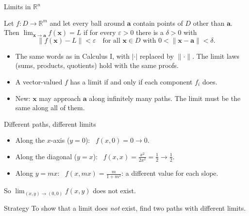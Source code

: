 \documentclass[10pt]{wosm-slides}
\newcommand{\R}{\mathbb{R}}
\newcommand{\norm}[1]{\lVert #1 \rVert}
\newcommand{\vx}{\mathbf{x}}
\newcommand{\va}{\mathbf{a}}
\begin{document}
\begin{frame}{Limits in $\R^n$}
  \begin{definition}
    Let $f\colon D \to \R^m$ and let every ball around $\va$ contain points of $D$ other than
    $\va$. Then $\lim_{\vx \to \va} f(\vx) = L$ if for every $\varepsilon > 0$ there is a
    $\delta > 0$ with
    \[ \norm{f(\vx) - L} < \varepsilon \quad\text{for all } \vx \in D
       \text{ with } 0 < \norm{\vx - \va} < \delta . \]
  \end{definition}
  \pause
  \begin{itemize}
    \item The same words as in Calculus I, with $|\cdot|$ replaced by $\norm{\cdot}$.
      The limit laws (sums, products, quotients) hold with the same proofs.
    \item A vector-valued $f$ has a limit if and only if each component $f_i$ does.
    \item New: $\vx$ may approach $\va$ along infinitely many paths. The limit must be the same
      along all of them.
  \end{itemize}
\end{frame}

\begin{frame}{Different paths, different limits}
  \begin{example}[$f(x, y) = \dfrac{xy}{x^2 + y^2}$ at $(0, 0)$]
    \begin{itemize}
      \item Along the $x$-axis ($y = 0$): \ $f(x, 0) = 0 \to 0$.
      \item Along the diagonal ($y = x$): \ $f(x, x) = \frac{x^2}{2x^2} = \frac12 \to \frac12$.
      \item Along $y = mx$: \ $f(x, mx) = \frac{m}{1 + m^2}$: a different value for each slope.
    \end{itemize}
    So $\lim_{(x,y)\to(0,0)} f(x, y)$ does not exist.
  \end{example}
  \pause
  \begin{block}{Strategy}
    To show that a limit does \emph{not} exist, find two paths with different limits.
  \end{block}
\end{frame}
\end{document}
